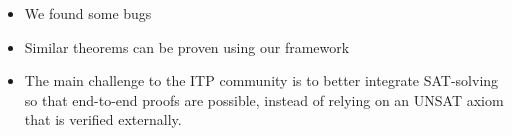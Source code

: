 \begin{itemize}
    \item We found some bugs 
    \item Similar theorems can be proven using our framework
    \item The main challenge to the ITP community is to better integrate SAT-solving so that end-to-end proofs are possible, instead of relying on an UNSAT axiom that is verified externally.
\end{itemize}
